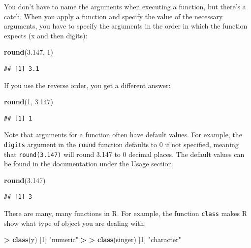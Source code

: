 \documentclass[
]{book}
\newenvironment{Shaded}{\begin{snugshade}}{\end{snugshade}}
\newcommand{\DecValTok}[1]{\textcolor[rgb]{0.00,0.00,0.81}{#1}}
\newcommand{\ErrorTok}[1]{\textcolor[rgb]{0.64,0.00,0.00}{\textbf{#1}}}
\newcommand{\FloatTok}[1]{\textcolor[rgb]{0.00,0.00,0.81}{#1}}
\newcommand{\FunctionTok}[1]{\textcolor[rgb]{0.13,0.29,0.53}{\textbf{#1}}}
\newcommand{\NormalTok}[1]{#1}
\newcommand{\SpecialCharTok}[1]{\textcolor[rgb]{0.81,0.36,0.00}{\textbf{#1}}}
\newcommand{\StringTok}[1]{\textcolor[rgb]{0.31,0.60,0.02}{#1}}
\begin{document}
You don't have to name the arguments when executing a function, but there's a catch. When you apply a function and specify the value of the necessary arguments, you have to specify the arguments in the order in which the function expects (x and then digits):

\begin{Shaded}
\begin{Highlighting}[]
\FunctionTok{round}\NormalTok{(}\FloatTok{3.147}\NormalTok{, }\DecValTok{1}\NormalTok{)}
\end{Highlighting}
\end{Shaded}

\begin{verbatim}
## [1] 3.1
\end{verbatim}

If you use the reverse order, you get a different answer:

\begin{Shaded}
\begin{Highlighting}[]
\FunctionTok{round}\NormalTok{(}\DecValTok{1}\NormalTok{, }\FloatTok{3.147}\NormalTok{)}
\end{Highlighting}
\end{Shaded}

\begin{verbatim}
## [1] 1
\end{verbatim}

Note that arguments for a function often have default values. For example, the \texttt{digits} argument in the \texttt{round} function defaults to 0 if not specified, meaning that \texttt{round(3.147)} will round 3.147 to 0 decimal places. The default values can be found in the documentation under the Usage section.

\begin{Shaded}
\begin{Highlighting}[]
\FunctionTok{round}\NormalTok{(}\FloatTok{3.147}\NormalTok{)}
\end{Highlighting}
\end{Shaded}

\begin{verbatim}
## [1] 3
\end{verbatim}

There are many, many functions in R. For example, the function \texttt{class} makes R show what type of object you are dealing with:

\begin{Shaded}
\begin{Highlighting}[]
\SpecialCharTok{\textgreater{}} \FunctionTok{class}\NormalTok{(y)}
\NormalTok{[}\DecValTok{1}\NormalTok{] }\StringTok{"numeric"}
\SpecialCharTok{\textgreater{}} 
\ErrorTok{\textgreater{}} \FunctionTok{class}\NormalTok{(singer)}
\NormalTok{[}\DecValTok{1}\NormalTok{] }\StringTok{"character"}
\end{Highlighting}
\end{Shaded}
\end{document}
